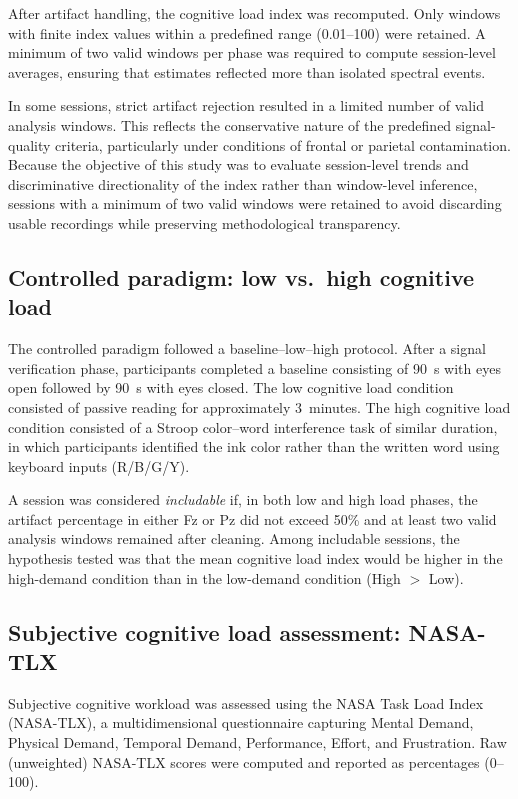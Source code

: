 \documentclass[10pt]{iopart}
\begin{document}
After artifact handling, the cognitive load index was recomputed. Only windows with finite index values within a predefined range (0.01--100) were retained. A minimum of two valid windows per phase was required to compute session-level averages, ensuring that estimates reflected more than isolated spectral events.

In some sessions, strict artifact rejection resulted in a limited number of valid analysis windows. This reflects the conservative nature of the predefined signal-quality criteria, particularly under conditions of frontal or parietal contamination. Because the objective of this study was to evaluate session-level trends and discriminative directionality of the index rather than window-level inference, sessions with a minimum of two valid windows were retained to avoid discarding usable recordings while preserving methodological transparency.


\subsection{Controlled paradigm: low vs.\ high cognitive load}
The controlled paradigm followed a baseline--low--high protocol. After a signal verification phase, participants completed a baseline consisting of 90~s with eyes open followed by 90~s with eyes closed. The low cognitive load condition consisted of passive reading for approximately 3~minutes. The high cognitive load condition consisted of a Stroop color--word interference task of similar duration, in which participants identified the ink color rather than the written word using keyboard inputs (R/B/G/Y).

A session was considered \emph{includable} if, in both low and high load phases, the artifact percentage in either Fz or Pz did not exceed 50\% and at least two valid analysis windows remained after cleaning. Among includable sessions, the hypothesis tested was that the mean cognitive load index would be higher in the high-demand condition than in the low-demand condition (High $>$ Low).

\subsection{Subjective cognitive load assessment: NASA-TLX}
Subjective cognitive workload was assessed using the NASA Task Load Index (NASA-TLX), a multidimensional questionnaire capturing Mental Demand, Physical Demand, Temporal Demand, Performance, Effort, and Frustration. Raw (unweighted) NASA-TLX scores were computed and reported as percentages (0--100).
\end{document}
